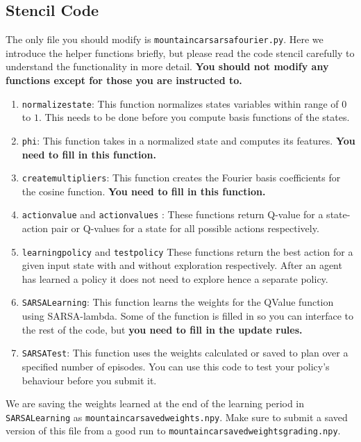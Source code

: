 \documentclass[12pt]{article}
\begin{document}
\subsection{Stencil Code}
The only file you should modify is \texttt{mountain\textunderscore car\textunderscore sarsa\textunderscore fourier.py}. Here we introduce the helper functions briefly, but please read the code stencil carefully to understand the functionality in more detail. \textbf{You should not modify any functions except for those you are instructed to.}
\begin{enumerate}
\item \texttt{normalize\textunderscore state}: This function normalizes states variables within range of $0$ to $1$. This needs to be done before you compute basis functions of the states. 
\item \texttt{phi}: This function takes in a normalized state and computes its features. \textbf{You need to fill in this function.}
\item \texttt{create\textunderscore multipliers}: This function creates the Fourier basis coefficients for the cosine function. \textbf{You need to fill in this function.}
\item \texttt{action\textunderscore value} and \texttt{action\textunderscore values} : These functions return Q-value for a state-action pair or Q-values for a state for all possible actions respectively. 
\item \texttt{learning\textunderscore policy} and \texttt{test\textunderscore policy} These functions return the best action for a given input state with and without exploration respectively. After an agent has learned a policy it does not need to explore hence a separate policy.
\item \texttt{SARSA\textunderscore Learning}: This function learns the weights for the QValue function using SARSA-lambda. Some of the function is filled in so you can interface to the rest of the code, but \textbf{you need to fill in the update rules.} \\ 

\item \texttt{SARSA\textunderscore Test}: This function uses the weights calculated or saved to plan over a specified number of episodes. You can use this code to test your policy's behaviour before you submit it.  
\end{enumerate}

We are saving the weights learned at the end of the learning period in  \texttt{SARSA\textunderscore Learning} as \texttt{mountain\textunderscore car\textunderscore saved\textunderscore weights.npy}. Make sure to submit a saved version of this file from a good run to  \texttt{mountain\textunderscore car\textunderscore saved\textunderscore weights\textunderscore grading.npy}.
\end{document}
